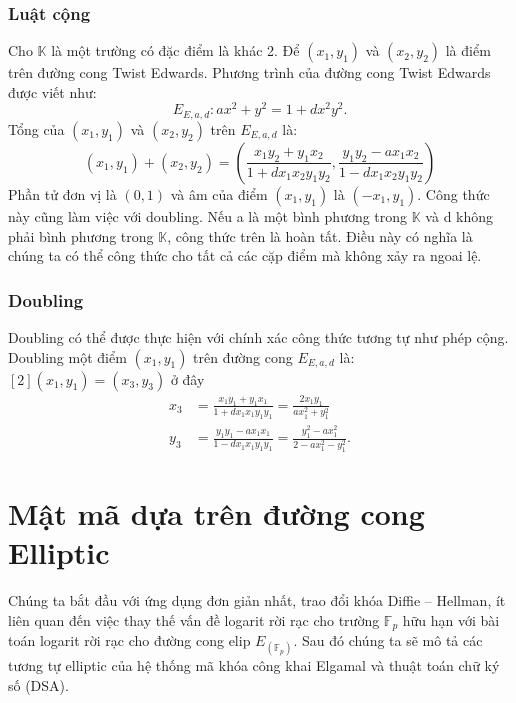 \documentclass[a4paper,12pt]{report}
\begin{document}
\subsubsection*{Luật cộng}
Cho $\displaystyle \mathbb{K}$ là một trường có đặc điểm là khác 2. Để $\displaystyle (x_{1}, y_{1})$ và $\displaystyle (x_{2}, y_{2})$ là điểm trên đường cong Twist Edwards. Phương trình của đường cong Twist Edwards được viết như:
\begin{displaymath}
E_{E,a,d}: ax^2 + y^2 = 1 + dx^2y^2.
\end{displaymath}
Tổng của $(x_1, y_1)$ và $(x_2, y_2)$ trên $E_{E,a,d}$ là:
\begin{displaymath}
(x_{1}, y_{1}) + (x_{2}, y_{2}) = \left({\frac {x_{1}y_{2} + y_{1}x_{2}} { 1 + dx_{1}x_{2}y_{1}y_{2}}}, {\frac{y_{1}y_{2} - ax_{1}x_{2}} {1 - dx_{1}x_{2}y_{1}y_{2}}} \right)
\end{displaymath}
Phần tử đơn vị là $(0,1)$ và âm của điểm $(x_1, y_1)$ là $(-x_1, y_1)$. Công thức này cũng làm việc với doubling. Nếu a là một bình phương trong $\mathbb{K}$ và d không phải bình phương trong $\mathbb{K}$, công thức trên là hoàn tất. Điều này có nghĩa là chúng ta có thể công thức cho tất cả các cặp điểm mà không xảy ra ngoai lệ.
\subsubsection*{Doubling}
Doubling có thể được thực hiện với chính xác công thức tương tự như phép cộng. Doubling một điểm $(x_1 , y_1)$ trên đường cong $E_{E,a,d}$ là: $[2](x_1, y_1) = (x_3, y_3)$ ở đây
\begin{displaymath}
\begin{aligned}
x_{3} &= {\frac{x_{1}y_{1}+y_{1}x_{1}}{1+dx_{1}x_{1}y_{1}y_{1}}}={\frac {2x_{1}y_{1}}{ax_{1}^{2}+y_{1}^{2}}} \\[6pt]
y_{3} &= {\frac {y_{1}y_{1} - ax_{1}x_{1}}{1 - dx_{1}x_{1}y_{1}y_{1}}}={\frac{y_{1}^{2} - ax_{1}^{2}}{2 - ax_{1}^{2} - y_{1}^{2}}}.
\end{aligned}
\end{displaymath}
\section{Mật mã dựa trên đường cong Elliptic}
Chúng ta bắt đầu với ứng dụng đơn giản nhất, trao đổi khóa Diffie – Hellman, ít liên quan đến việc thay thế vấn đề logarit rời rạc cho trường $\mathbb{F}_p$ hữu hạn với bài toán logarit rời rạc cho đường cong elip $E_(\mathbb{F}_p)$. Sau đó chúng ta sẽ mô tả các tương tự elliptic của hệ thống mã khóa công khai Elgamal và thuật toán chữ ký số (DSA).
\end{document}
